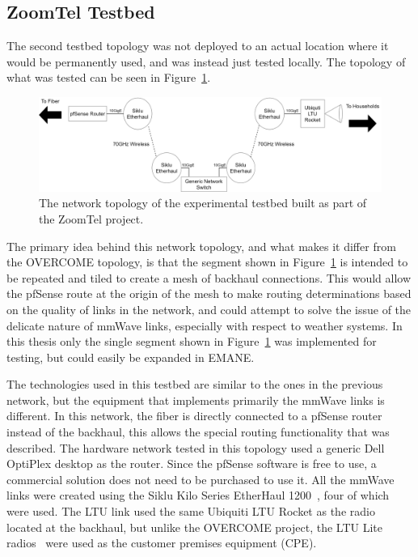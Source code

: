 \subsection{ZoomTel Testbed}
The second testbed topology was not deployed to an actual location where it would be permanently used, and was instead just tested locally.
The topology of what was tested can be seen in Figure~\ref{ZoomTel_topology}.
\begin{figure}[!ht]
    \centering
    \includegraphics[width=\textwidth,keepaspectratio]{Images/Chpt3/ZoomTel_Topology.png}
    \caption{The network topology of the experimental testbed built as part of the ZoomTel project.}
    \label{ZoomTel_topology}
\end{figure}
The primary idea behind this network topology, and what makes it differ from the OVERCOME topology, is that the segment shown in Figure~\ref{ZoomTel_topology} is intended to be repeated and tiled to create a mesh of backhaul connections.
This would allow the pfSense route at the origin of the mesh to make routing determinations based on the quality of links in the network, and could attempt to solve the issue of the delicate nature of mmWave links, especially with respect to weather systems.
In this thesis only the single segment shown in Figure~\ref{ZoomTel_topology} was implemented for testing, but could easily be expanded in EMANE.\par
The technologies used in this testbed are similar to the ones in the previous network, but the equipment that implements primarily the mmWave links is different.
In this network, the fiber is directly connected to a pfSense router instead of the backhaul, this allows the special routing functionality that was described.
The hardware network tested in this topology used a generic Dell OptiPlex desktop as the router.
Since the pfSense software is free to use, a commercial solution does not need to be purchased to use it.
All the mmWave links were created using the Siklu Kilo Series EtherHaul 1200~\cite{etherhaul}, four of which were used.
The LTU link used the same Ubiquiti LTU Rocket as the radio located at the backhaul, but unlike the OVERCOME project, the LTU Lite radios~\cite{ltulite} were used as the customer premises equipment (CPE).


